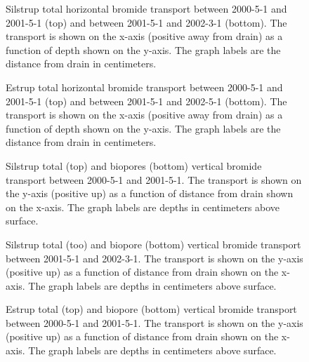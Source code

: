 \begin{figure}[htbp]
  \centering
  
  \caption{Silstrup total horizontal bromide transport between 2000-5-1 and
    2001-5-1 (top) and between 2001-5-1 and 2002-3-1 (bottom).  The
    transport is shown on the x-axis (positive away from drain) as a
    function of depth shown on the y-axis.  The graph labels are the
    distance from drain in centimeters.}
  \label{fig:Silstrup-Bromide-horizontal}
\end{figure}

\begin{figure}[htbp]
  \centering
  
  \caption{Estrup total horizontal bromide transport between 2000-5-1 and
    2001-5-1 (top) and between 2001-5-1 and 2002-5-1 (bottom).  The
    transport is shown on the x-axis (positive away from drain) as a
    function of depth shown on the y-axis.  The graph labels are the
    distance from drain in centimeters.}
  \label{fig:Estrup-Bromide-horizontal}
\end{figure}

\begin{figure}[htbp]
  \centering
  
  \caption{Silstrup total (top) and biopores (bottom) vertical bromide
    transport between 2000-5-1 and 2001-5-1.  The transport is shown on the
    y-axis (positive up) as a function of distance from drain shown on
    the x-axis.  The graph labels are depths in centimeters above
    surface.}
  \label{fig:Silstrup-Bromide-2000-vertical}
\end{figure}

\begin{figure}[htbp]
  \centering
  
  \caption{Silstrup total (too) and biopore (bottom) vertical bromide
    transport between 2001-5-1 and 2002-3-1.  The transport is shown on the
    y-axis (positive up) as a function of distance from drain shown on
    the x-axis.  The graph labels are depths in centimeters above
    surface.}
  \label{fig:Silstrup-Bromide-2001-vertical}
\end{figure}

\begin{figure}[htbp]
  \centering
  
  \caption{Estrup total (top) and biopore (bottom) vertical bromide
    transport between 2000-5-1 and 2001-5-1.  The transport is shown on the
    y-axis (positive up) as a function of distance from drain shown on
    the x-axis.  The graph labels are depths in centimeters above
    surface.}
  \label{fig:Estrup-Bromide-2000-vertical}
\end{figure}

